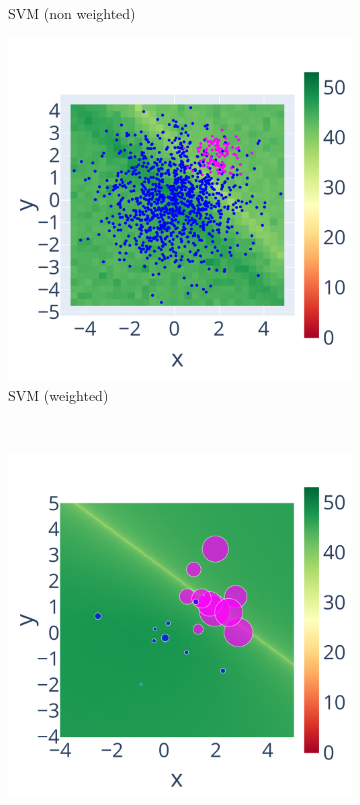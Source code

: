 \documentclass[10pt,journal,compsoc]{IEEEtran}
\begin{document}
\begin{figure}
\begin{subfigure}{.45\linewidth}
        \caption{SVM (non weighted)}
        \label{fig:SVM_nw_sig}
    \end{subfigure}
    \begin{subfigure}{.45\linewidth}
        \includegraphics[width=\linewidth]{figure/SVM/weighted.pdf}
        \caption{SVM (weighted)}
        \label{fig:SVM_w_sig}
    \end{subfigure} \\
    \begin{subfigure}{.45\linewidth}
        \includegraphics[width=\linewidth]{figure/Weighted/non_weighted.pdf}

\end{subfigure}
\end{figure}
\end{document}
